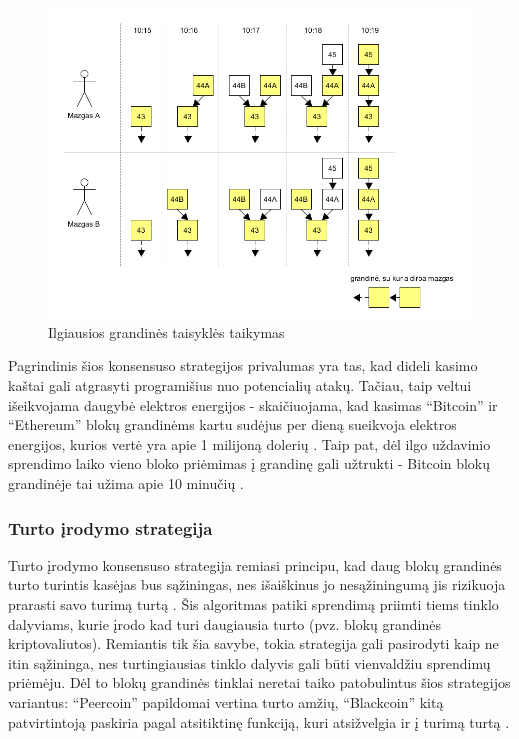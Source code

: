 \begin{figure}[H]
    \centering
    \includegraphics[scale=0.6]{img/blockchainLongestRule}
    \caption{Ilgiausios grandinės taisyklės taikymas}
    \label{fig:blockchainLongestRule}
\end{figure}

Pagrindinis šios konsensuso strategijos privalumas yra tas, kad dideli kasimo kaštai gali atgrasyti programišius nuo potencialių atakų. Tačiau,
taip veltui išeikvojama daugybė elektros energijos - skaičiuojama, kad kasimas \enquote{Bitcoin} ir \enquote{Ethereum} blokų grandinėms kartu sudėjus per dieną
sueikvoja elektros energijos, kurios vertė yra apie 1 milijoną dolerių \cite{Ethereum}. Taip pat, dėl ilgo uždavinio sprendimo laiko vieno bloko priėmimas į grandinę
gali užtrukti - Bitcoin blokų grandinėje tai užima apie 10 minučių \cite{Zheng2017}.

\subsubsection{Turto įrodymo strategija}

Turto įrodymo konsensuso strategija remiasi principu, kad daug blokų grandinės turto turintis kasėjas
bus sąžiningas, nes išaiškinus jo nesąžiningumą jis rizikuoja prarasti savo turimą turtą \cite{Baars2016}. Šis algoritmas patiki sprendimą priimti
tiems tinklo dalyviams, kurie įrodo kad turi daugiausia turto (pvz. blokų grandinės kriptovaliutos). Remiantis tik šia savybe, tokia strategija gali pasirodyti kaip ne itin sąžininga,
nes turtingiausias tinklo dalyvis gali būti vienvaldžiu sprendimų priėmėju. Dėl to blokų grandinės tinklai neretai taiko patobulintus šios strategijos
variantus: \enquote{Peercoin} papildomai vertina turto amžių, \enquote{Blackcoin} kitą patvirtintoją paskiria pagal atsitiktinę funkciją, kuri atsižvelgia ir į turimą turtą \cite{Zheng2017}.

